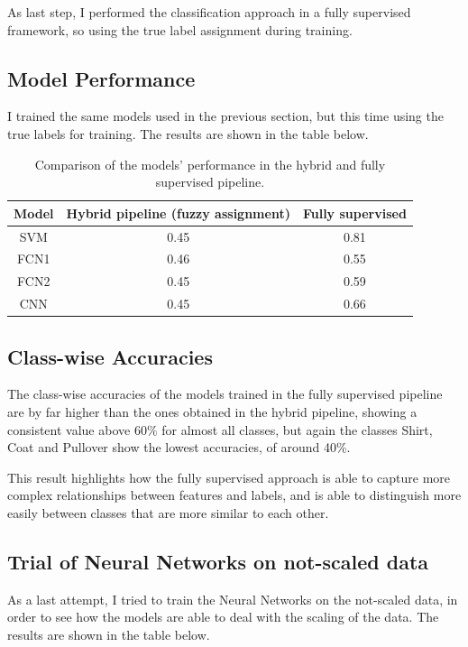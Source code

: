 \documentclass[a4paper, 10pt]{article}
\begin{document}
As last step, I performed the classification approach in a fully supervised framework, so using the true label assignment during training.

\subsection{Model Performance}
I trained the same models used in the previous section, but this time using the true labels for training. The results are shown in the table below.

\begin{table}[ht]
    \centering
    \begin{tabular}{|c|c|c|}
        \hline
        \textbf{Model} & \textbf{Hybrid pipeline (fuzzy assignment)} & \textbf{Fully supervised} \\
        \hline
        \hline
        SVM  & 0.45 & 0.81 \\
        FCN1 & 0.46 & 0.55 \\
        FCN2 & 0.45 & 0.59 \\
        CNN  & 0.45 & 0.66 \\
        \hline
    \end{tabular}
    \caption{Comparison of the models' performance in the hybrid and fully supervised pipeline.}
    \label{tab:comparison}
\end{table}

\subsection{Class-wise Accuracies}
The class-wise accuracies of the models trained in the fully supervised pipeline are by far higher than the ones obtained in the hybrid pipeline, showing a 
consistent value above $60\%$ for almost all classes, but again the classes Shirt, Coat and Pullover show the lowest accuracies, of around 40\%.

This result highlights how the fully supervised approach is able to capture more complex relationships between features and labels, and is able to distinguish
more easily between classes that are more similar to each other.

\subsection{Trial of Neural Networks on not-scaled data}
As a last attempt, I tried to train the Neural Networks on the not-scaled data, in order to see how the models are able to deal with the scaling of the data.
The results are shown in the table below.
\end{document}
